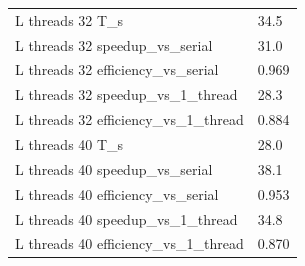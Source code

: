 \begin{tabular}{ll}
L threads 32 T\_s & 34.5 \\
L threads 32 speedup\_vs\_serial & 31.0 \\
L threads 32 efficiency\_vs\_serial & 0.969 \\
L threads 32 speedup\_vs\_1\_thread & 28.3 \\
L threads 32 efficiency\_vs\_1\_thread & 0.884 \\
L threads 40 T\_s & 28.0 \\
L threads 40 speedup\_vs\_serial & 38.1 \\
L threads 40 efficiency\_vs\_serial & 0.953 \\
L threads 40 speedup\_vs\_1\_thread & 34.8 \\
L threads 40 efficiency\_vs\_1\_thread & 0.870 \\
\end{tabular}
